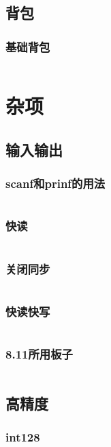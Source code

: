 \documentclass[a4paper,11pt]{article}
\begin{document}
\subsection{背包}
\subsubsection{基础背包}
\inputminted[breaklines,linenos,frame=leftline]{c++}{DP/pack.cpp}

\newpage
\section{杂项}

\subsection{输入输出}
\subsubsection{scanf和prinf的用法}
\inputminted[breaklines,linenos,frame=leftline]{c++}{others/read4.cpp}
\subsubsection{快读}
\inputminted[breaklines,linenos,frame=leftline]{c++}{others/read1.cpp}
\subsubsection{关闭同步}
\inputminted[breaklines,linenos,frame=leftline]{c++}{others/read2.cpp}
\subsubsection{快读快写}
\inputminted[breaklines,linenos,frame=leftline]{c++}{others/read3.cpp}
\subsubsection{8.11所用板子}
\inputminted[breaklines,linenos,frame=leftline]{c++}{others/7.19.cpp}

\subsection{高精度}
\subsubsection{int128}
\inputminted[breaklines,linenos,frame=leftline]{c++}{others/int128.cpp}
\end{document}
